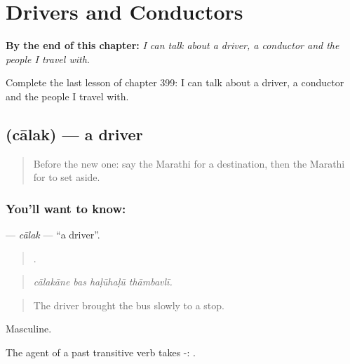 
\chapter{Drivers and Conductors}
\label{ch:mr-drivers-and-conductors}

\begin{chapteropening}
\textbf{By the end of this chapter:} \emph{I can talk about a driver, a conductor and the people I travel with.}

Complete the last lesson of chapter 399: I can talk about a driver, a conductor and the people I travel with.
\end{chapteropening}

\section[\texorpdfstring{\mr{चालक} (cālak)}{चालक (cālak)}]{ (cālak) — a driver}

\label{lesson:MR-C399-calak}



\begin{quote}
Before the new one: say the Marathi for a destination, then the Marathi for to set aside.
\end{quote}

\subsection*{You'll want to know: }
\textbf{} — \emph{cālak} — \textquotedblleft{}a driver\textquotedblright{}.

\begin{quote}
   .
\end{quote}

\begin{quote}
\emph{cālakāne bas haḷūhaḷū thāmbavlī.}
\end{quote}

\begin{quote}
The driver brought the bus slowly to a stop.
\end{quote}

Masculine.

The agent of a past transitive verb takes -:   .

